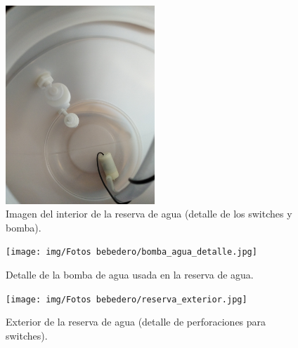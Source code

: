 \documentclass[12pt]{article}
\begin{document}
	\pagebreak
	
	\begin{figure}[h!]
		\begin{center}
			\includegraphics[width=0.5\textwidth]{img/Fotos bebedero/bebedero_switches_bomba.jpg}
			\caption{Imagen del interior de la reserva de agua (detalle de los switches y bomba).}
			\label{Prototipo: reserva agua (detalle interior)}
		\end{center}
	\end{figure}
	
	\pagebreak
	
	\begin{figure}[h!]
		\begin{center}
			\texttt{[image: img/Fotos bebedero/bomba\_agua\_detalle.jpg]}
			\caption{Detalle de la bomba de agua usada en la reserva de agua.}
			\label{Prototipo: bomba agua (detalle)}
		\end{center}
	\end{figure}
	
	\pagebreak
	
	\begin{figure}[h!]
		\begin{center}
			\texttt{[image: img/Fotos bebedero/reserva\_exterior.jpg]}
			\caption{Exterior de la reserva de agua (detalle de perforaciones para switches).}
			\label{Prototipo: reserva agua (detalle exterior)}
		\end{center}
	\end{figure}
	
	
\end{document}
